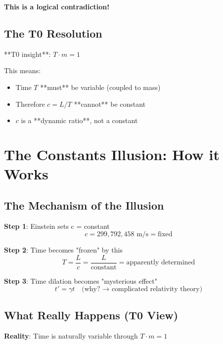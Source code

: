 \documentclass[12pt,a4paper]{article}
\newcommand{\Tfield}{T}
\begin{document}
	\textbf{This is a logical contradiction!}
	
	\subsection{The T0 Resolution}
	
	**T0 insight**: $\Tfield \cdot m = 1$
	
	This means:
	\begin{itemize}
		\item Time $\Tfield$ **must** be variable (coupled to mass)
		\item Therefore $c = L/T$ **cannot** be constant
		\item $c$ is a **dynamic ratio**, not a constant
	\end{itemize}
	
	\section{The Constants Illusion: How it Works}
	
	\subsection{The Mechanism of the Illusion}
	
	\textbf{Step 1}: Einstein sets c = constant
	\begin{equation}
		c = 299,792,458 \text{ m/s} = \text{fixed}
	\end{equation}
	
	\textbf{Step 2}: Time becomes "frozen" by this
	\begin{equation}
		T = \frac{L}{c} = \frac{L}{\text{constant}} = \text{apparently determined}
	\end{equation}
	
	\textbf{Step 3}: Time dilation becomes "mysterious effect"
	\begin{equation}
		t' = \gamma t \quad \text{(why? → complicated relativity theory)}
	\end{equation}
	
	\subsection{What Really Happens (T0 View)}
	
	\textbf{Reality}: Time is naturally variable through $\Tfield \cdot m = 1$
	
\end{document}
